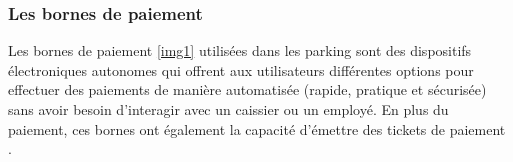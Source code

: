 



\subsubsection{Les bornes de paiement}
Les bornes de paiement \ref{img1} utilisées dans les parking sont des dispositifs électroniques autonomes qui offrent aux utilisateurs différentes options pour effectuer des paiements de manière automatisée (rapide, pratique et sécurisée) sans avoir besoin d'interagir avec un caissier ou un employé. En plus du paiement, ces bornes ont également la capacité d'émettre des tickets de paiement \cite{ch2_Transpor19}.

